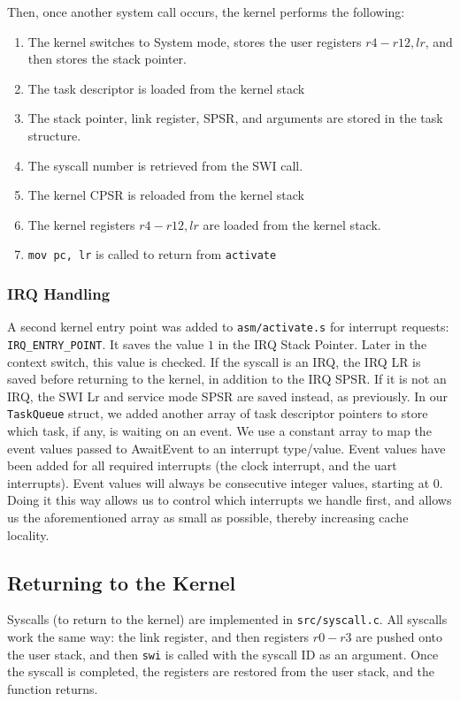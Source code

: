 \documentclass{article}
\begin{document}
Then, once another system call occurs, the kernel performs the following:
\begin{enumerate}
\item The kernel switches to System mode, stores the user registers $r4-r12, lr$, and then stores the stack pointer.
\item The task descriptor is loaded from the kernel stack
\item The stack pointer, link register, SPSR, and arguments are stored in the task structure.
\item The syscall number is retrieved from the SWI call.
\item The kernel CPSR is reloaded from the kernel stack
\item The kernel registers $r4-r12, lr$ are loaded from the kernel stack.
\item \verb|mov pc, lr| is called to return from \verb|activate|
\end{enumerate}

\subsubsection{IRQ Handling}
    A second kernel entry point was added to \verb|asm/activate.s| for interrupt requests: \verb|IRQ_ENTRY_POINT|. It saves the value $1$ in the IRQ Stack Pointer. Later in the context switch, this value is checked. If the syscall is an IRQ, the IRQ LR is saved before returning to the kernel, in addition to the IRQ SPSR. If it is not an IRQ, the SWI Lr and service mode SPSR are saved instead, as previously.
In our \verb|TaskQueue| struct, we added another array of task descriptor pointers to store which task, if any, is waiting on an event.
We use a constant array to map the event values passed to AwaitEvent to an interrupt type/value. Event values have been added for all required interrupts (the clock interrupt, and the uart interrupts). Event values will always be consecutive integer values, starting at 0. Doing it this way allows us to control which interrupts we handle first, and allows us the aforementioned array as small as possible, thereby increasing cache locality.

\subsection{Returning to the Kernel}
Syscalls (to return to the kernel) are implemented in \verb|src/syscall.c|. All syscalls work the same way: the link register, and then registers $r0-r3$ are pushed onto the user stack, and then \verb|swi| is called with the syscall ID as an argument. Once the syscall is completed, the registers are restored from the user stack, and the function returns.
\end{document}
